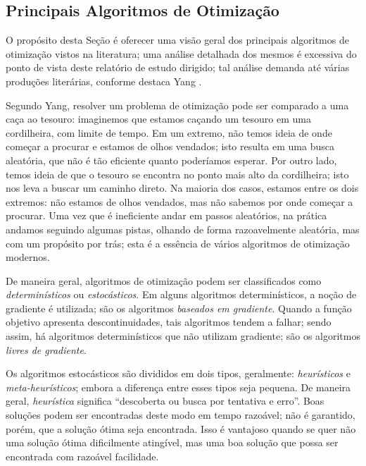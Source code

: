 \subsection{Principais Algoritmos de Otimiza\c{c}\~{a}o}
O prop\'{o}sito desta Se\c{c}\~{a}o \'{e} oferecer uma vis\~{a}o geral dos principais algoritmos de otimiza\c{c}\~{a}o vistos na literatura; uma an\'{a}lise detalhada dos mesmos \'{e} excessiva do ponto de vista deste relat\'{o}rio de estudo dirigido; tal an\'{a}lise demanda at\'{e} v\'{a}rias produ\c{c}\~{o}es liter\'{a}rias, conforme destaca Yang \cite{yang}.

Segundo Yang, resolver um problema de otimiza\c{c}\~{a}o pode ser comparado a uma ca\c{c}a ao tesouro: imaginemos que estamos ca\c{c}ando um tesouro em uma cordilheira, com limite de tempo. Em um extremo, n\~{a}o temos ideia de onde come\c{c}ar a procurar e estamos de olhos vendados; isto resulta em uma busca aleat\'{o}ria, que n\~{a}o \'{e} t\~{a}o eficiente quanto poder\'{i}amos esperar. Por outro lado, temos ideia de que o tesouro se encontra no ponto mais alto da cordilheira; isto nos leva a buscar um caminho direto. Na maioria dos casos, estamos entre os dois extremos: n\~{a}o estamos de olhos vendados, mas n\~{a}o sabemos por onde come\c{c}ar a procurar. Uma vez que \'{e} ineficiente andar em passos aleat\'{o}rios, na pr\'{a}tica andamos seguindo algumas pistas, olhando de forma razoavelmente aleat\'{o}ria, mas com um prop\'{o}sito por tr\'{a}s; esta \'{e} a ess\^{e}ncia de v\'{a}rios algoritmos de otimiza\c{c}\~{a}o modernos.

De maneira geral, algoritmos de otimiza\c{c}\~{a}o podem ser classificados como \textit{determin\'{i}sticos} ou \textit{estoc\'{a}sticos}. Em alguns algoritmos determin\'{i}sticos, a no\c{c}\~{a}o de gradiente \'{e} utilizada; s\~{a}o os algoritmos \textit{baseados em gradiente}. Quando a fun\c{c}\~{a}o objetivo apresenta descontinuidades, tais algoritmos tendem a falhar; sendo assim, h\'{a} algoritmos determin\'{i}sticos que n\~{a}o utilizam gradiente; s\~{a}o os algoritmos \textit{livres de gradiente}.

Os algoritmos estoc\'{a}sticos s\~{a}o divididos em dois tipos, geralmente: \textit{heur\'{i}sticos} e \textit{meta-heur\'{i}sticos}; embora a diferen\c{c}a entre esses tipos seja pequena. De maneira geral, \textit{heur\'{i}stica} significa ``descoberta ou busca por tentativa e erro''. Boas solu\c{c}\~{o}es podem ser encontradas deste modo em tempo razo\'{a}vel; n\~{a}o \'{e} garantido, por\'{e}m, que a solu\c{c}\~{a}o \'{o}tima seja encontrada. Isso \'{e} vantajoso quando se quer n\~{a}o uma solu\c{c}\~{a}o \'{o}tima dificilmente ating\'{i}vel, mas uma boa solu\c{c}\~{a}o que possa ser encontrada com razo\'{a}vel facilidade.

